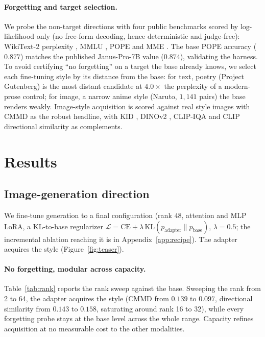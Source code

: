 \documentclass{article}
\begin{document}
\paragraph{Forgetting and target selection.}
We probe the non-target directions with four public benchmarks scored by
log-likelihood only (no free-form decoding, hence deterministic and judge-free):
WikiText-2 perplexity \citep{wikitext}, MMLU \citep{mmlu}, POPE \citep{pope} and
MME \citep{mme}. The base POPE accuracy ($0.877$) matches the published
Janus-Pro-7B value ($0.874$), validating the harness. To avoid certifying ``no
forgetting'' on a target the base already knows, we select each fine-tuning style
by its distance from the base: for text, poetry (Project Gutenberg) is the most
distant candidate at $4.0\times$ the perplexity of a modern-prose control; for
image, a narrow anime style (Naruto, $1{,}141$ pairs) the base renders weakly.
Image-style acquisition is scored against real style images with CMMD
\citep{cmmd} as the robust headline, with KID \citep{kid}, DINOv2
\citep{dinov2}, CLIP-IQA \citep{clipiqa} and CLIP directional similarity
\citep{stylegannada} as complements.

\section{Results}

\subsection{Image-generation direction}
\label{sec:image}
We fine-tune generation to a final configuration (rank $48$, attention and MLP LoRA, a
KL-to-base regularizer
$\mathcal{L}=\mathrm{CE}+\lambda\,\mathrm{KL}(p_{\text{adapter}}\|p_{\text{base}})$,
$\lambda{=}0.5$; the incremental ablation reaching it is in Appendix~\ref{app:recipe}). The adapter
acquires the style (Figure~\ref{fig:teaser}).

\paragraph{No forgetting, modular across capacity.}
Table~\ref{tab:rank} reports the rank sweep against the base. Sweeping the rank from 2 to 64, the adapter acquires the style (CMMD
from $0.139$ to $0.097$, directional similarity from $0.143$ to $0.158$,
saturating around rank 16 to 32), while every forgetting probe stays at the base
level across the whole range. Capacity refines acquisition at no measurable cost
to the other modalities.
\end{document}

